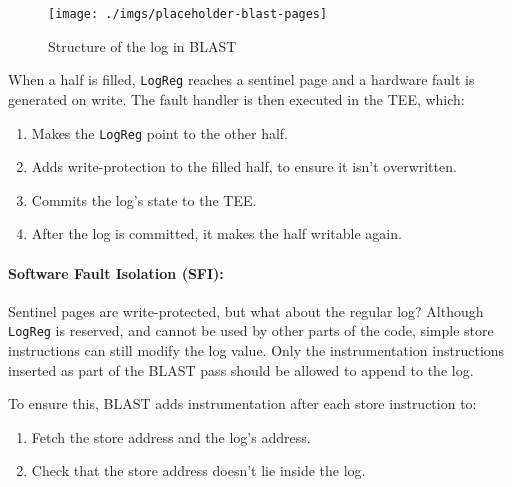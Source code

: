 \documentclass[a4paper, nobind]{templates/ociamthesis}
\providecommand{\tightlist}{%
  \setlength{\itemsep}{0pt}\setlength{\parskip}{0pt}}
\begin{document}
\begin{figure}[H]

{\centering \texttt{[image: ./imgs/placeholder-blast-pages]} 

}

\caption{Structure of the log in BLAST}\label{fig:blast-log-pages}
\end{figure}

When a half is filled, \texttt{LogReg} reaches a sentinel page and a hardware fault is generated on write.
The fault handler is then executed in the TEE, which:

\begin{enumerate}
\def\labelenumi{\arabic{enumi}.}
\tightlist
\item
  Makes the \texttt{LogReg} point to the other half.
\item
  Adds write-protection to the filled half, to ensure it isn't overwritten.
\item
  Commits the log's state to the TEE.
\item
  After the log is committed, it makes the half writable again.
\end{enumerate}

\paragraph{Software Fault Isolation (SFI):}\label{blastsfi}

Sentinel pages are write-protected, but what about the regular log?
Although \texttt{LogReg} is reserved, and cannot be used by other parts of the code,
simple store instructions can still modify the log value. Only the instrumentation
instructions inserted as part of the BLAST pass should be allowed to append to the log.

To ensure this, BLAST adds instrumentation after each store instruction to:

\begin{enumerate}
\def\labelenumi{\arabic{enumi}.}
\tightlist
\item
  Fetch the store address and the log's address.
\item
  Check that the store address doesn't lie inside the log.
\end{enumerate}
\end{document}
